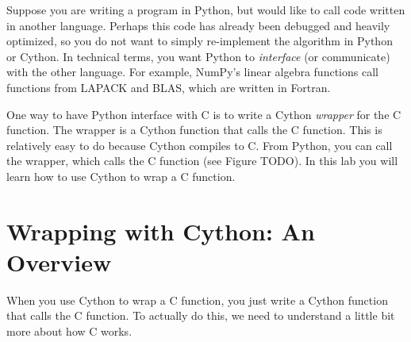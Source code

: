 
\label{lab:cythonwrap}

Suppose you are writing a program in Python, but would like to call code written in another language.
Perhaps this code has already been debugged and heavily optimized, so you do not want to simply re-implement the algorithm in Python or Cython.
In technical terms, you want Python to \emph{interface} (or communicate) with the other language.
For example, NumPy's linear algebra functions call functions from LAPACK and BLAS, which are written in Fortran.

One way to have Python interface with C is to write a Cython \emph{wrapper} for the C function.
The wrapper is a Cython function that calls the C function. 
This is relatively easy to do because Cython compiles to C.
From Python, you can call the wrapper, which calls the C function (see Figure TODO).
In this lab you will learn how to use Cython to wrap a C function.

\section*{Wrapping with Cython: An Overview}
When you use Cython to wrap a C function, you just write a Cython function that calls the C function.
To actually do this, we need to understand a little bit more about how C works.

